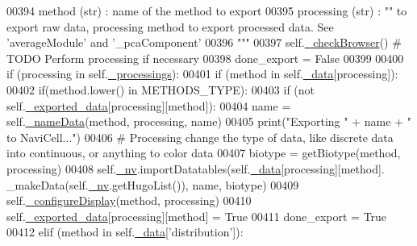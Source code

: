 \begin{DoxyCode}
00394 \textcolor{stringliteral}{            method (str) : name of the method to export}
00395 \textcolor{stringliteral}{            processing (str) : "" to export raw data, processing method to export
       processed data. See 'averageModule' and '\_pcaComponent'}
00396 \textcolor{stringliteral}{        """}
00397         self.\hyperlink{classnavicom_1_1navicom_1_1NaviCom_ab468a31a5f439bcae23f4c75b8c67f65}{_checkBrowser}() \textcolor{comment}{# TODO Perform processing if necessary}
00398         done\_export = \textcolor{keyword}{False}
00399 
00400         \textcolor{keywordflow}{if} (processing \textcolor{keywordflow}{in} self.\hyperlink{classnavicom_1_1navicom_1_1NaviCom_ac6a14d6a91cd2f236eef71496a6f249c}{_processings}):
00401             \textcolor{keywordflow}{if} (method \textcolor{keywordflow}{in} self.\hyperlink{classnavicom_1_1navicom_1_1NaviCom_a407b2b5c30a5652ee85c4be54b3e6679}{_data}[processing]):
00402                 \textcolor{keywordflow}{if}(method.lower() \textcolor{keywordflow}{in} METHODS\_TYPE):
00403                     \textcolor{keywordflow}{if} (\textcolor{keywordflow}{not} self.\hyperlink{classnavicom_1_1navicom_1_1NaviCom_ab7328fbbe89a1b3cb2db8c3d456d958f}{_exported_data}[processing][method]):
00404                         name = self.\hyperlink{classnavicom_1_1navicom_1_1NaviCom_a140128d0fd12930347cc2375c154072d}{_nameData}(method, processing, name)
00405                         \textcolor{keywordflow}{print}(\textcolor{stringliteral}{"Exporting "} + name + \textcolor{stringliteral}{" to NaviCell..."})
00406                         \textcolor{comment}{# Processing change the type of data, like discrete data 
      into continuous, or anything to color data}
00407                         biotype = getBiotype(method, processing)
00408                         self.\hyperlink{classnavicom_1_1navicom_1_1NaviCom_afff3fd56fa16a68bab52ba8d801e325a}{_nv}.importDatatables(self.\hyperlink{classnavicom_1_1navicom_1_1NaviCom_a407b2b5c30a5652ee85c4be54b3e6679}{_data}[processing][method].
      \_makeData(self.\hyperlink{classnavicom_1_1navicom_1_1NaviCom_afff3fd56fa16a68bab52ba8d801e325a}{_nv}.getHugoList()), name, biotype)
00409                         self.\hyperlink{classnavicom_1_1navicom_1_1NaviCom_a5bde750c01abc8e64338fb148c59b435}{_configureDisplay}(method, processing)
00410                         self.\hyperlink{classnavicom_1_1navicom_1_1NaviCom_ab7328fbbe89a1b3cb2db8c3d456d958f}{_exported_data}[processing][method] = \textcolor{keyword}{True}
00411                         done\_export = \textcolor{keyword}{True}
00412                 \textcolor{keywordflow}{elif} (method \textcolor{keywordflow}{in} self.\hyperlink{classnavicom_1_1navicom_1_1NaviCom_a407b2b5c30a5652ee85c4be54b3e6679}{_data}[\textcolor{stringliteral}{'distribution'}]):

\end{DoxyCode}
